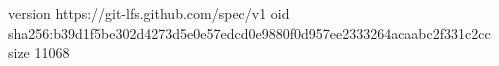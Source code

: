 version https://git-lfs.github.com/spec/v1
oid sha256:b39d1f5be302d4273d5e0e57edcd0e9880f0d957ee2333264acaabc2f331c2cc
size 11068
